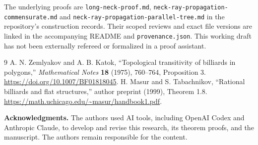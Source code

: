 \documentclass[11pt]{article}
\theoremstyle{definition}
\begin{document}
The underlying proofs are \texttt{long-neck-proof.md}, \texttt{neck-ray-propagation-commensurate.md} and \texttt{neck-ray-propagation-parallel-tree.md} in the repository's construction records. Their scoped reviews and exact file versions are linked in the accompanying README and \texttt{provenance.json}. This working draft has not been externally refereed or formalized in a proof assistant.

\begin{thebibliography}{9}
 A. N. Zemlyakov and A. B. Katok, ``Topological transitivity of billiards in polygons,'' \emph{Mathematical Notes} \textbf{18} (1975), 760--764, Proposition 3. \url{https://doi.org/10.1007/BF01818045}.
 H. Masur and S. Tabachnikov, ``Rational billiards and flat structures,'' author preprint (1999), Theorem 1.8. \url{https://math.uchicago.edu/~masur/handbook1.pdf}.
\end{thebibliography}

\smallskip\noindent\textbf{Acknowledgments.} The authors used AI tools, including OpenAI Codex and Anthropic Claude, to develop and revise this research, its theorem proofs, and the manuscript. The authors remain responsible for the content.
\end{document}
